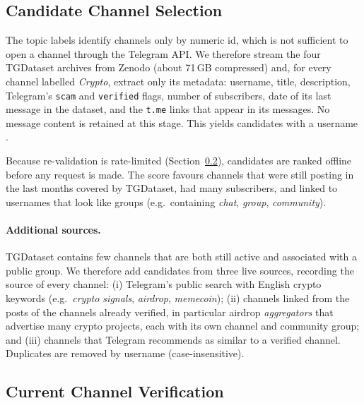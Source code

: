 \subsection{Candidate Channel Selection}
\label{subsec:candidate-selection}

The topic labels identify channels only by numeric id, which is not sufficient
to open a channel through the Telegram API. We therefore stream the four
TGDataset archives from Zenodo (about 71\,GB compressed) and, for every channel
labelled \emph{Crypto}, extract only its metadata: username, title,
description, Telegram's \texttt{scam} and \texttt{verified} flags, number of
subscribers, date of its last message in the dataset, and the \texttt{t.me}
links that appear in its messages. No message content is retained at this stage.
This yields  candidates with a username .

Because re-validation is rate-limited (Section~\ref{subsec:channel-verification}),
candidates are ranked offline before any request is made. The score favours
channels that were still posting in the last months covered by TGDataset, had
many subscribers, and linked to usernames that look like groups (e.g.\
containing \emph{chat}, \emph{group}, \emph{community}).

\paragraph{Additional sources.}
TGDataset contains few channels that are both still active and associated with
a public group. We therefore add candidates from three live sources, recording
the source of every channel:
(i) Telegram's public search with  English crypto keywords
(e.g.\ \emph{crypto signals}, \emph{airdrop}, \emph{memecoin});
(ii) channels linked from the posts of the channels already verified, in
particular airdrop \emph{aggregators} that advertise many crypto projects, each
with its own channel and community group; and
(iii) channels that Telegram recommends as similar to a verified channel.
Duplicates are removed by username (case-insensitive).

\subsection{Current Channel Verification}
\label{subsec:channel-verification}

